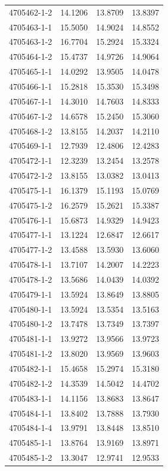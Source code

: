 \begin{longtable}{lrrr}
4705462-1-2 & 14.1206 & 13.8709 & 13.8397 \\
4705463-1-1 & 15.5050 & 14.9024 & 14.8552 \\
4705463-1-2 & 16.7704 & 15.2924 & 15.3324 \\
4705464-1-2 & 15.4737 & 14.9726 & 14.9064 \\
4705465-1-1 & 14.0292 & 13.9505 & 14.0478 \\
4705466-1-1 & 15.2818 & 15.3530 & 15.3498 \\
4705467-1-1 & 14.3010 & 14.7603 & 14.8333 \\
4705467-1-2 & 14.6578 & 15.2450 & 15.3060 \\
4705468-1-2 & 13.8155 & 14.2037 & 14.2110 \\
4705469-1-1 & 12.7939 & 12.4806 & 12.4283 \\
4705472-1-1 & 12.3239 & 13.2454 & 13.2578 \\
4705472-1-2 & 13.8155 & 13.0382 & 13.0413 \\
4705475-1-1 & 16.1379 & 15.1193 & 15.0769 \\
4705475-1-2 & 16.2579 & 15.2621 & 15.3387 \\
4705476-1-1 & 15.6873 & 14.9329 & 14.9423 \\
4705477-1-1 & 13.1224 & 12.6847 & 12.6617 \\
4705477-1-2 & 13.4588 & 13.5930 & 13.6060 \\
4705478-1-1 & 13.7107 & 14.2007 & 14.2223 \\
4705478-1-2 & 13.5686 & 14.0439 & 14.0392 \\
4705479-1-1 & 13.5924 & 13.8649 & 13.8805 \\
4705480-1-1 & 13.5924 & 13.5354 & 13.5163 \\
4705480-1-2 & 13.7478 & 13.7349 & 13.7397 \\
4705481-1-1 & 13.9272 & 13.9566 & 13.9723 \\
4705481-1-2 & 13.8020 & 13.9569 & 13.9603 \\
4705482-1-1 & 15.4658 & 15.2974 & 15.3180 \\
4705482-1-2 & 14.3539 & 14.5042 & 14.4702 \\
4705483-1-1 & 14.1156 & 13.8683 & 13.8647 \\
4705484-1-1 & 13.8402 & 13.7888 & 13.7930 \\
4705484-1-4 & 13.9791 & 13.8448 & 13.8510 \\
4705485-1-1 & 13.8764 & 13.9169 & 13.8971 \\
4705485-1-2 & 13.3047 & 12.9741 & 12.9533 \\

\end{longtable}
